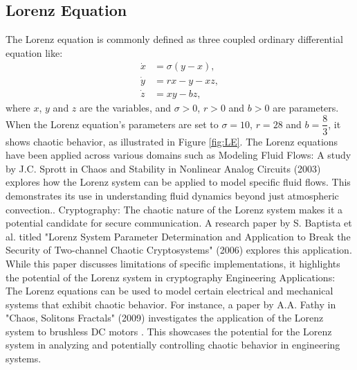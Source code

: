 \documentclass[11pt]{article}
\begin{document}
\subsection{Lorenz Equation}
The Lorenz equation is commonly defined as three coupled ordinary differential equation like:
\begin{align*}
\dot{x} &= \sigma(y - x), \\
\dot{y} &= rx - y - xz, \\
\dot{z} &= xy - bz,
\end{align*}
where $x$, $y$ and $z$ are the variables, and $\sigma > 0$, $r > 0$ and $b > 0$ are parameters. \\
When the Lorenz equation's parameters are set to $\sigma = 10$, $r = 28$ and $b = \dfrac{8}{3}$, it shows chaotic behavior, as illustrated in Figure \ref{fig:LE}. The Lorenz equations \cite{lorenz_deterministic_1963} have been applied across various domains such as Modeling Fluid Flows:  A study by J.C. Sprott in Chaos and Stability in Nonlinear Analog Circuits (2003) \cite{tlelo-cuautle_analogdigital_2019} explores how the Lorenz system can be applied to model specific fluid flows. This demonstrates its use in understanding fluid dynamics beyond just atmospheric convection.\cite{petrzela_chaos_2022}.
Cryptography: The chaotic nature of the Lorenz system makes it a potential candidate for secure communication. A research paper by S. Baptista et al. titled "Lorenz System Parameter Determination and Application to Break the Security of Two-channel Chaotic Cryptosystems" (2006) explores this application. While this paper discusses limitations of specific implementations, it highlights the potential of the Lorenz system in cryptography \cite{orue_lorenz_2006}
Engineering Applications: The Lorenz equations can be used to model certain electrical and mechanical systems that exhibit chaotic behavior. For instance, a paper by A.A. Fathy in "Chaos, Solitons  Fractals" (2009) investigates the application of the Lorenz system to brushless DC motors \cite{ge_anti-control_2006}. This showcases the potential for the Lorenz system in analyzing and potentially controlling chaotic behavior in engineering systems.
\end{document}
